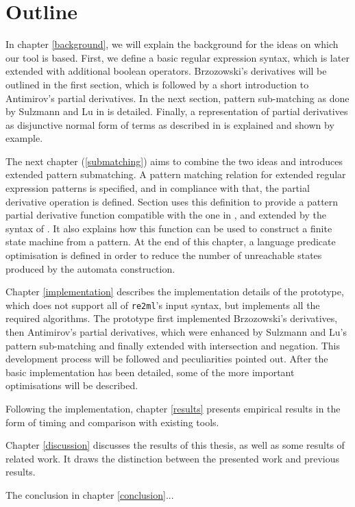 \section{Outline}

In chapter \ref{background}, we will explain the background for the ideas on
which our tool is based. First, we define a basic regular expression syntax,
which is later extended with additional boolean operators. Brzozowski's
derivatives will be outlined in the first section, which is followed by a short
introduction to Antimirov's partial derivatives. In the next section, pattern
sub-matching as done by Sulzmann and Lu in \cite{pdpat} is detailed. Finally, a
representation of partial derivatives as disjunctive normal form of terms as
described in \cite{pdere} is explained and shown by example.

The next chapter (\ref{submatching}) aims to combine the two ideas and
introduces extended pattern submatching. A pattern matching relation for
extended regular expression patterns is specified, and in compliance with that,
the partial derivative operation is defined. Section \label{nfa} uses this
definition to provide a pattern partial derivative function compatible with the
one in \cite{pdpat}, and extended by the syntax of \cite{pdere}. It also
explains how this function can be used to construct a finite state machine from
a pattern. At the end of this chapter, a language predicate optimisation is
defined in order to reduce the number of unreachable states produced by the
automata construction.

Chapter \ref{implementation} describes the implementation details of the
prototype, which does not support all of \texttt{re2ml}'s input syntax, but
implements all the required algorithms. The prototype first implemented
Brzozowski's derivatives, then Antimirov's partial derivatives, which were
enhanced by Sulzmann and Lu's pattern sub-matching and finally extended with
intersection and negation. This development process will be followed and
peculiarities pointed out. After the basic implementation has been detailed,
some of the more important optimisations will be described.

Following the implementation, chapter \ref{results} presents empirical results
in the form of timing and comparison with existing tools.

Chapter \ref{discussion} discusses the results of this thesis, as well as some
results of related work. It draws the distinction between the presented work and
previous results.

The conclusion in chapter \ref{conclusion}...


